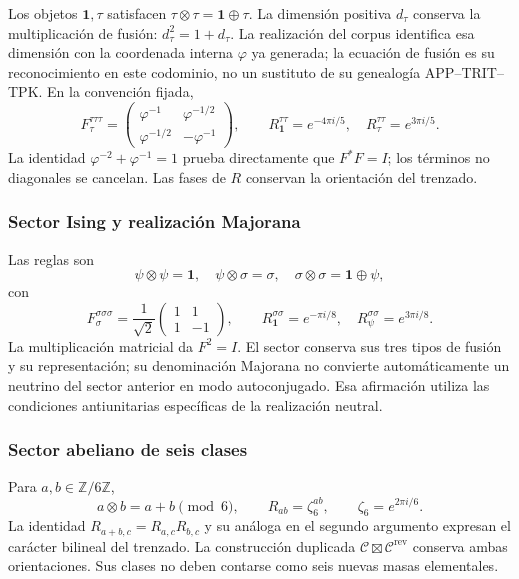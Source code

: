 Los objetos \(\mathbf1,\tau\) satisfacen
\(\tau\otimes\tau=\mathbf1\oplus\tau\). La dimensión positiva
\(d_\tau\) conserva la multiplicación de fusión:
\(d_\tau^2=1+d_\tau\). La realización del corpus identifica esa
dimensión con la coordenada interna \(\varphi\) ya generada; la
ecuación de fusión es su reconocimiento en este codominio, no un
sustituto de su genealogía APP--TRIT--TPK. En la convención fijada,
\[
 F_\tau^{\tau\tau\tau}=\begin{pmatrix}
 \varphi^{-1}&\varphi^{-1/2}\\
 \varphi^{-1/2}&-\varphi^{-1}
 \end{pmatrix},\qquad
 R_{\mathbf1}^{\tau\tau}=e^{-4\pi i/5},\quad
 R_\tau^{\tau\tau}=e^{3\pi i/5}.
\]
La identidad \(\varphi^{-2}+\varphi^{-1}=1\) prueba directamente
que \(F^*F=I\); los términos no diagonales se cancelan. Las fases
de \(R\) conservan la orientación del trenzado.

\subsubsection{Sector Ising y realización Majorana}

Las reglas son
\[
 \psi\otimes\psi=\mathbf1,\quad
 \psi\otimes\sigma=\sigma,\quad
 \sigma\otimes\sigma=\mathbf1\oplus\psi,
\]
con
\[
 F_\sigma^{\sigma\sigma\sigma}=\frac1{\sqrt2}
 \begin{pmatrix}1&1\\1&-1\end{pmatrix},\qquad
 R_{\mathbf1}^{\sigma\sigma}=e^{-\pi i/8},\quad
 R_\psi^{\sigma\sigma}=e^{3\pi i/8}.
\]
La multiplicación matricial da \(F^2=I\). El sector conserva sus
tres tipos de fusión y su representación; su denominación Majorana
no convierte automáticamente un neutrino del sector anterior en modo
autoconjugado. Esa afirmación utiliza las condiciones antiunitarias
específicas de la realización neutral.

\subsubsection{Sector abeliano de seis clases}

Para \(a,b\in\mathbb Z/6\mathbb Z\),
\[
 a\otimes b=a+b\pmod6,\qquad
 R_{ab}=\zeta_6^{ab},\qquad\zeta_6=e^{2\pi i/6}.
\]
La identidad \(R_{a+b,c}=R_{a,c}R_{b,c}\) y su análoga en el
segundo argumento expresan el carácter bilineal del trenzado.
La construcción duplicada
\(\mathcal C\boxtimes\mathcal C^{\mathrm{rev}}\) conserva ambas
orientaciones. Sus clases no deben contarse como seis nuevas masas
elementales.

